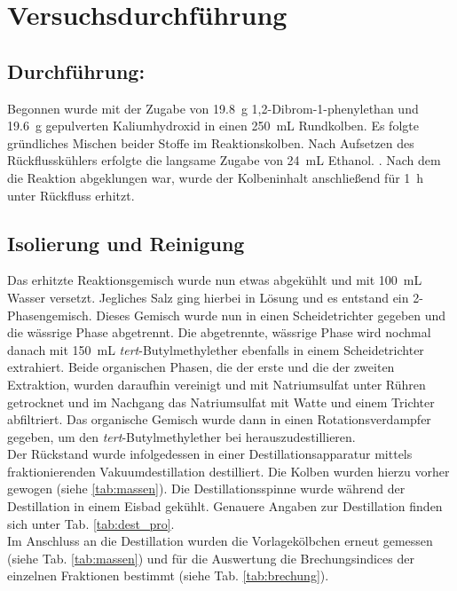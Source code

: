 \section{Versuchsdurchführung}
\label{sec:durchfuerung}
\vspace*{-5mm}
\vspace*{-3mm}
\subsection*{Durchführung:}
Begonnen wurde mit der Zugabe von \SI{19,8}{\gram} 1,2-Dibrom-1-phenylethan und \SI{19,6}{\gram} gepulverten Kaliumhydroxid in einen \SI{250}{\milli \liter} Rundkolben. Es folgte gründliches Mischen beider Stoffe im Reaktionskolben. Nach Aufsetzen des Rückflusskühlers erfolgte die langsame Zugabe von \SI{24}{\milli \liter} Ethanol. . Nach dem die Reaktion abgeklungen war, wurde der Kolbeninhalt anschließend für \SI{1}{\hour} unter Rückfluss erhitzt.

\subsection*{Isolierung und Reinigung}
Das erhitzte Reaktionsgemisch wurde nun etwas abgekühlt und mit \SI{100}{\milli \liter} Wasser versetzt. Jegliches Salz ging hierbei in Lösung und es entstand ein 2-Phasengemisch. Dieses Gemisch wurde nun in einen Scheidetrichter gegeben und die wässrige Phase abgetrennt. Die abgetrennte, wässrige Phase wird nochmal danach mit \SI{150}{\milli \liter} \textit{tert}-Butylmethylether ebenfalls in einem Scheidetrichter extrahiert.
Beide organischen Phasen, die der erste und die der zweiten Extraktion, wurden daraufhin vereinigt und mit  Natriumsulfat unter Rühren getrocknet und im Nachgang das Natriumsulfat mit Watte und einem Trichter abfiltriert. Das organische Gemisch wurde dann in einen Rotationsverdampfer gegeben, um den \textit{tert}-Butylmethylether bei  herauszudestillieren. \\
Der Rückstand wurde infolgedessen in einer Destillationsapparatur mittels fraktionierenden Vakuumdestillation destilliert. Die Kolben wurden hierzu vorher gewogen (siehe \ref{tab:massen}).
Die Destillationsspinne wurde während der Destillation in einem Eisbad gekühlt. Genauere Angaben zur Destillation finden sich unter Tab. \ref{tab:dest_pro}.\\
Im Anschluss an die Destillation wurden die Vorlagekölbchen erneut gemessen (siehe Tab. \ref{tab:massen}) und für die Auswertung die Brechungsindices der einzelnen Fraktionen bestimmt (siehe Tab. \ref{tab:brechung}). 

